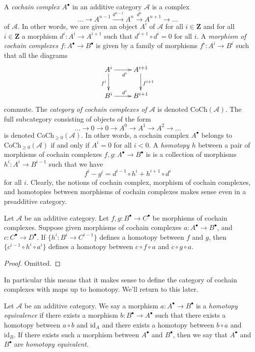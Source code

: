 \noindent
A {\it cochain complex $A^\bullet$} in an additive category $\mathcal{A}$
is a complex
$$
\ldots \to
A^{n - 1} \xrightarrow{d^{n - 1}}
A^n \xrightarrow{d^n}
A^{n + 1} \to
\ldots
$$
of $\mathcal{A}$. In other words, we are given an object $A^i$ of
$\mathcal{A}$ for all $i \in \mathbf{Z}$ and for
all $i \in \mathbf{Z}$ a morphism $d^i : A^i \to A^{i + 1}$ such that
$d^{i + 1} \circ d^i = 0$ for all $i$. A {\it morphism of cochain
complexes $f : A^\bullet \to B^\bullet$} is given by a
family of morphisms $f^i : A^i \to B^i$ such that all
the diagrams
$$
\xymatrix{
A^i \ar[r]_{d^i} \ar[d]_{f^i} & A^{i + 1} \ar[d]^{f^{i + 1}} \\
B^i \ar[r]^{d^i} & B^{i + 1}
}
$$
commute. The {\it category of cochain complexes of $\mathcal{A}$}
is denoted $\text{CoCh}(\mathcal{A})$. The full subcategory consisting
of objects of the form
$$
\ldots \to 0 \to 0 \to A^0 \to A^1 \to A^2 \to \ldots
$$
is denoted $\text{CoCh}_{\geq 0}(\mathcal{A})$.
In other words, a cochain complex $A^\bullet$ belongs to
$\text{CoCh}_{\geq 0}(\mathcal{A})$ if and only if
$A^i = 0$ for all $i < 0$.
A {\it homotopy $h$} between a pair of morphisms
of cochain complexes $f, g : A^\bullet \to B^\bullet$ is
is a collection of morphisms $h^i : A^i \to B^{i - 1}$
such that we have
$$
f^i - g^i = d^{i - 1} \circ h^i + h^{i + 1} \circ d^i
$$
for all $i$. Clearly, the notions of cochain complex, morphism of
cochain complexes, and homotopies between morphisms of cochain complexes
makes sense even in a preadditive category.

\begin{lemma}
\label{lemma-compose-homotopy-cochain}
Let $\mathcal{A}$ be an additive category.
Let $f, g : B^\bullet \to C^\bullet$ be morphisms
of cochain complexes. Suppose given morphisms of cochain
complexes $a : A^\bullet \to B^\bullet$, and
$c : C^\bullet \to D^\bullet$.
If $\{h^i : B^i \to C^{i - 1}\}$ defines a homotopy
between $f$ and $g$, then $\{c^{i - 1} \circ h^i \circ a^i\}$
defines a homotopy between $c \circ f \circ a$ and
$c \circ g \circ a$.
\end{lemma}

\begin{proof}
Omitted.
\end{proof}

\noindent
In particular this means that it makes sense to define
the category of cochain complexes with maps up to homotopy.
We'll return to this later.

\begin{definition}
\label{definition-homotopy-equivalent-cochain}
Let $\mathcal{A}$ be an additive category.
We say a morphism $a : A^\bullet \to B^\bullet$
is a {\it homotopy equivalence} if there exists
a morphism $b : B^\bullet \to A^\bullet$
such that there exists a homotopy between
$a \circ b$ and $\text{id}_A$
and there exists a homotopy between $b \circ a$ and $\text{id}_B$.
If there exists such a morphism between $A^\bullet$ and $B^\bullet$, then
we say that $A^\bullet$ and $B^\bullet$ are {\it homotopy equivalent}.
\end{definition}

